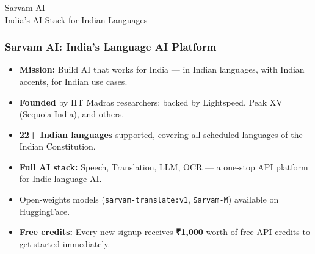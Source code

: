 \begin{frame}[fragile]\frametitle{}
\begin{center}
{\Large Sarvam AI}\\[0.5em]
{\normalsize India's AI Stack for Indian Languages}
\end{center}
\end{frame}

\begin{frame}[fragile]\frametitle{Sarvam AI: India's Language AI Platform}
  \begin{itemize}
    \item \textbf{Mission:} Build AI that works for India --- in Indian languages, with Indian accents, for Indian use cases.
    \item \textbf{Founded} by IIT Madras researchers; backed by Lightspeed, Peak XV (Sequoia India), and others.
    \item \textbf{22+ Indian languages} supported, covering all scheduled languages of the Indian Constitution.
    \item \textbf{Full AI stack:} Speech, Translation, LLM, OCR --- a one-stop API platform for Indic language AI.
    \item Open-weights models (\texttt{sarvam-translate:v1}, \texttt{Sarvam-M}) available on HuggingFace.
    \item \textbf{Free credits:} Every new signup receives \textbf{₹1,000} worth of free API credits to get started immediately.
  \end{itemize}
\end{frame}

